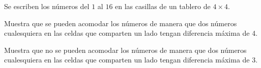 Se escriben los números del $1$ al $16$ en las casillas de un tablero de $4\times 4$. 

Muestra que se pueden acomodar los números de manera que dos números cualesquiera en las celdas que comparten un lado tengan diferencia máxima de 4. 

Muestra que no se pueden acomodar los números de manera que dos números cualesquiera en las celdas que comparten un lado tengan diferencia máxima de 3.
